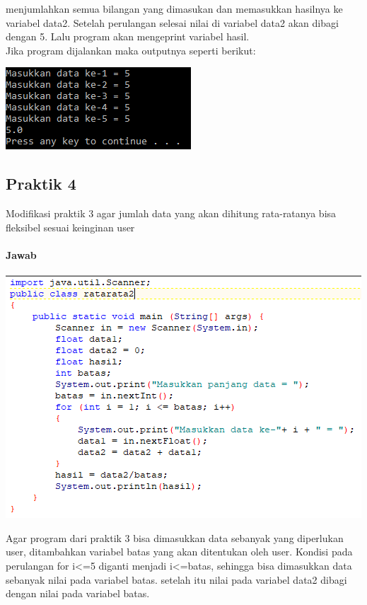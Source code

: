 \documentclass[a4paper,12pt]{article}
\begin{document}
menjumlahkan semua bilangan yang dimasukan dan memasukkan hasilnya ke variabel data2. Setelah perulangan selesai nilai di variabel data2 akan dibagi dengan 5. Lalu program akan mengeprint
variabel hasil.\\
Jika program dijalankan maka outputnya seperti berikut:
\begin{center}
    \includegraphics[scale = 0.8]{prak3b.PNG}
\end{center}

\subsection{Praktik 4}
Modifikasi praktik 3 agar jumlah data yang akan dihitung rata-ratanya bisa fleksibel sesuai keinginan user
\paragraph{Jawab}
\begin{center}
    \includegraphics[scale = 0.8]{prak4.PNG}
\end{center}
Agar program dari praktik 3 bisa dimasukkan data sebanyak yang diperlukan user, ditambahkan variabel batas yang akan ditentukan oleh user. Kondisi pada perulangan for i<=5 diganti menjadi
i<=batas, sehingga bisa dimasukkan data sebanyak nilai pada variabel batas. setelah itu nilai pada variabel data2 dibagi dengan nilai pada variabel batas.
\end{document}
